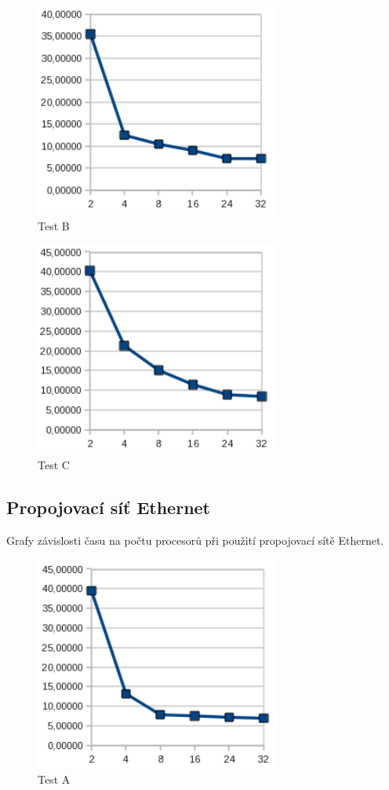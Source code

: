 \documentclass[12pt]{article}
\begin{document}
\begin{figure}[H]
\begin{center}
\includegraphics[width=8cm]{grafy-zprava/testBinfib.png}
\caption{Test B}
\label{fig:testBinfib}
\end{center}
\end{figure}

\begin{figure}[H]
\begin{center}
\includegraphics[width=8cm]{grafy-zprava/testCinfib.png}
\caption{Test C}
\label{fig:testCinfib}
\end{center}
\end{figure}

\subsection{Propojovací síť Ethernet}
Grafy závislosti času na počtu procesorů při použití propojovací sítě Ethernet.
\begin{figure}[H]
\begin{center}
\includegraphics[width=8cm]{grafy-zprava/testAeth.png}
\caption{Test A}
\label{fig:testAether}
\end{center}
\end{figure}
\end{document}
